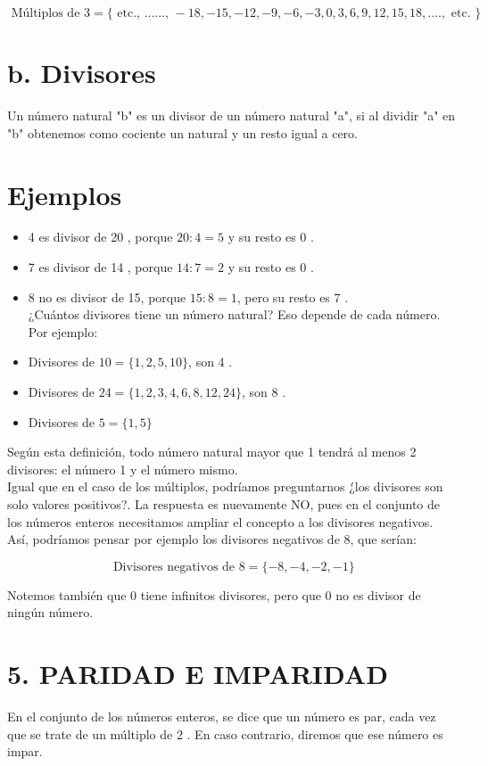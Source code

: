 \documentclass[10pt]{article}
\begin{document}
$$
\text { Múltiplos de } 3=\{\text { etc., ......, }-18,-15,-12,-9,-6,-3,0,3,6,9,12,15,18, \ldots ., \text { etc. }\}
$$

\section*{b. Divisores}
Un número natural "b" es un divisor de un número natural "a", si al dividir "a" en "b" obtenemos como cociente un natural y un resto igual a cero.

\section*{Ejemplos}
\begin{itemize}
  \item 4 es divisor de 20 , porque $20: 4=5$ y su resto es 0 .
  \item 7 es divisor de 14 , porque $14: 7=2$ y su resto es 0 .
  \item 8 no es divisor de 15, porque $15: 8=1$, pero su resto es 7 .\\
¿Cuántos divisores tiene un número natural? Eso depende de cada número. Por ejemplo:
  \item Divisores de $10=\{1,2,5,10\}$, son 4 .
  \item Divisores de $24=\{1,2,3,4,6,8,12,24\}$, son 8 .
  \item Divisores de $5=\{1,5\}$
\end{itemize}

Según esta definición, todo número natural mayor que 1 tendrá al menos 2 divisores: el número 1 y el número mismo.\\
Igual que en el caso de los múltiplos, podríamos preguntarnos ¿́los divisores son solo valores positivos?. La respuesta es nuevamente NO, pues en el conjunto de los números enteros necesitamos ampliar el concepto a los divisores negativos. Así, podríamos pensar por ejemplo los divisores negativos de 8, que serían:

$$
\text { Divisores negativos de } 8=\{-8,-4,-2,-1\}
$$

Notemos también que 0 tiene infinitos divisores, pero que 0 no es divisor de ningún número.

\section*{5. PARIDAD E IMPARIDAD}
En el conjunto de los números enteros, se dice que un número es par, cada vez que se trate de un múltiplo de 2 . En caso contrario, diremos que ese número es impar.
\end{document}
